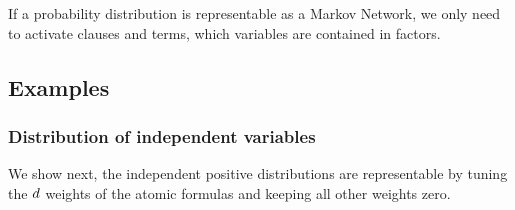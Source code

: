 \begin{remark}
	If a probability distribution is representable as a Markov Network, we only need to activate clauses and terms, which variables are contained in factors.
\end{remark}










\subsection{Examples}


\subsubsection{Distribution of independent variables}

We show next, the independent positive distributions are representable by tuning the $d$ weights of the atomic formulas and keeping all other weights zero.

